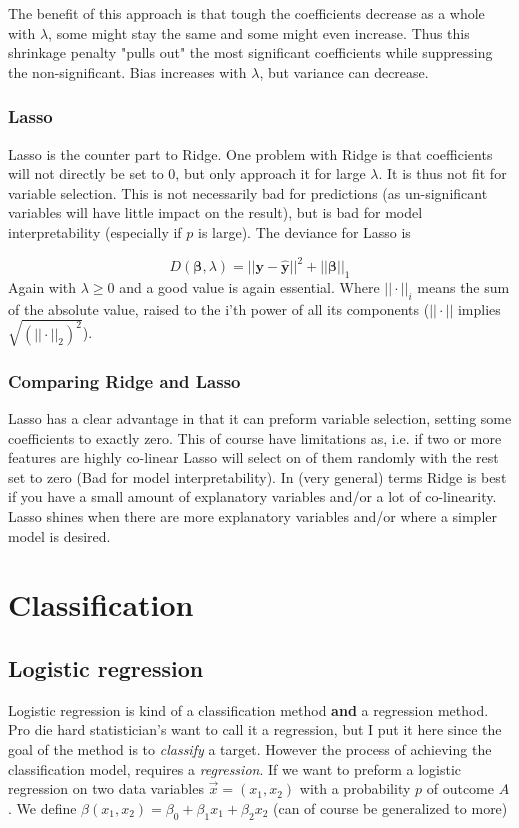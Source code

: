 \documentclass{article}
\renewcommand{\vec}[1]{\mathbf{#1}} %
\newcommand{\vecsym}[1]{\boldsymbol{#1}} %
\begin{document}
The benefit of this approach is that tough the coefficients decrease as a whole with $\lambda$, some might stay the same and some might even increase. Thus this shrinkage penalty "pulls out" the most significant coefficients while suppressing the non-significant. Bias increases with $\lambda$, but variance can decrease.       
    
\subsubsection{Lasso}
Lasso is the counter part to Ridge. One problem with Ridge is that coefficients will not directly be set to 0, but only approach it for large $\lambda$. It is thus not fit for variable selection. This is not necessarily bad for predictions (as un-significant variables will have little impact on the result), but is bad for model interpretability (especially if $p$ is large). The deviance for Lasso is

\begin{equation*}
    D(\vecsym{\beta}, \lambda) = ||\vec{y} - \hat{\vec{y}}||^2 + ||\vecsym{\beta}||_1
\end{equation*}
Again with $\lambda \geq 0$ and a good value is again essential. Where $|| \cdot ||_i$ means the sum of the absolute value, raised to the i'th power of all its components ($|| \cdot ||$ implies $\sqrt{(|| \cdot ||_{2})^2}$). 

\subsubsection{Comparing Ridge and Lasso}
Lasso has a clear advantage in that it can preform variable selection, setting some coefficients to exactly zero. This of course have limitations as, i.e. if two or more features are highly co-linear Lasso will select on of them randomly with the rest set to zero (Bad for model interpretability). In (very general) terms Ridge is best if you have a small amount of explanatory variables and/or a lot of co-linearity. Lasso shines when there  are more explanatory variables and/or where a simpler model is desired.   

\section{Classification}
\subsection{Logistic regression}
Logistic regression is kind of a classification method \textbf{and} a regression method. Pro die hard statistician's want to call it a regression, but I put it here since the goal of the method is to \textit{classify} a target. However the process of achieving the classification model, requires a \textit{regression}. If we want to preform a logistic regression on two data variables $\Vec{x} = (x_1, x_2)$ with a probability $p$ of outcome $A$. We define $\beta(x_1, x_2) = \beta_0 + \beta_1 x_1 + \beta_2 x_2$ (can of course be generalized to more)
\end{document}
